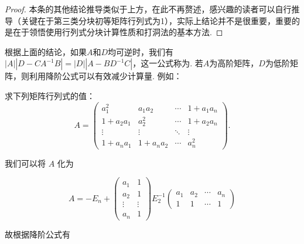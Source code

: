 \begin{enumerate}
\begin{proof}
              本条的其他结论推导类似于上方，在此不再赘述，感兴趣的读者可以自行推导（关键在于第三类分块初等矩阵行列式为1），实际上结论并不是很重要，重要的是在于领悟使用行列式分块计算性质和打洞法的基本方法.
          \end{proof}

          根据上面的结论，如果$A$和$D$均可逆时，我们有$|A||D-CA^{-1}B|=|D||A-BD^{-1}C|$，这一公式称为. 若$A$为高阶矩阵，$D$为低阶矩阵，则利用降阶公式可以有效减少计算量. 例如：

          \begin{example}{}{}
              求下列矩阵行列式的值：
              \[A=\begin{pmatrix}
                  a_1^2 & a_1a_2 & \cdots & 1+a_1a_n \\
                  1+a_2a_1 & a_2^2 & \cdots & 1+a_2a_n \\
                  \vdots & \vdots & \ddots & \vdots \\
                  1+a_na_1 & 1+a_na_2 & \cdots & a_n^2
              \end{pmatrix}.\]
          \end{example}

          \begin{solution}
            我们可以将 $A$ 化为

            \[ A = -E_n + \begin{pmatrix}
                a_1 & 1 \\ a_2 & 1 \\ \vdots & \vdots \\ a_n & 1
            \end{pmatrix} E_2^{-1} \begin{pmatrix}
                a_1 & a_2 & \cdots & a_n \\ 1 & 1 & \cdots & 1
            \end{pmatrix} \]

            故根据降阶公式有


\end{solution}
\end{enumerate}
